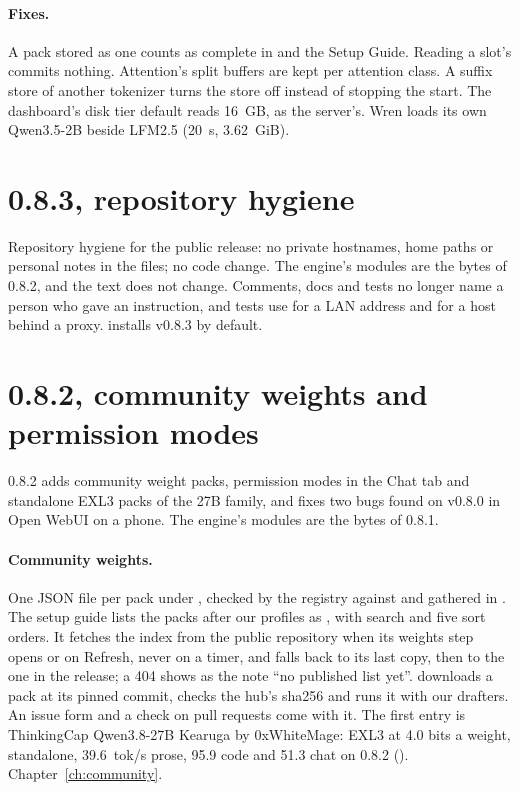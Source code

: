 \paragraph{Fixes.} A pack stored as one  counts as complete in  and the Setup Guide. Reading a slot's  commits nothing. Attention's split buffers are kept per attention class. A suffix store of another tokenizer turns the store off instead of stopping the start. The dashboard's disk tier default reads 16~GB, as the server's. Wren loads its own Qwen3.5-2B beside LFM2.5 (20~s, 3.62~GiB).

\section{0.8.3, repository hygiene}\label{sec:changelog-083}

Repository hygiene for the public release: no private hostnames, home paths or personal notes in the files; no code change. The engine's modules are the bytes of 0.8.2, and the text does not change. Comments, docs and tests no longer name a person who gave an instruction, and tests use  for a LAN address and  for a host behind a proxy.  installs v0.8.3 by default.

\section{0.8.2, community weights and permission modes}\label{sec:changelog-082}

0.8.2 adds community weight packs, permission modes in the Chat tab and standalone EXL3 packs of the 27B family, and fixes two bugs found on v0.8.0 in Open WebUI on a phone. The engine's modules are the bytes of 0.8.1.

\paragraph{Community weights.} One JSON file per pack under , checked by the registry against  and gathered in . The setup guide lists the packs after our profiles as , with search and five sort orders. It fetches the index from the public repository when its weights step opens or on Refresh, never on a timer, and falls back to its last copy, then to the one in the release; a 404 shows as the note \enquote{no published list yet}.  downloads a pack at its pinned commit, checks the hub's sha256 and runs it with our drafters. An issue form and a check on pull requests come with it. The first entry is ThinkingCap Qwen3.8-27B Kearuga by 0xWhiteMage: EXL3 at 4.0 bits a weight, standalone, 39.6~tok/s prose, 95.9 code and 51.3 chat on 0.8.2 (\measured). Chapter~\ref{ch:community}.

